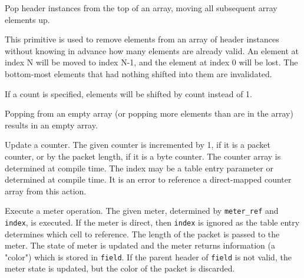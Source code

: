 \documentclass[12pt]{article}
\begin{document}

{ %
Pop header instances from the top of an array, moving all subsequent array elements up.
}
{ %
}
{ %
This primitive is used to remove elements from an array of header instances
without knowing in advance how many elements are already valid. An element at
index N will be moved to index N-1, and the element at index 0 will be lost. The
bottom-most elements that had nothing shifted into them are invalidated.


If a count is specified, elements will be shifted by count instead of 1.


Popping from an empty array (or popping more elements than are in the array)
results in an empty array.
}


{ %
Update a counter.
}
{ %
}
{ %
The given counter is incremented by 1, if it is a packet counter, or by the 
packet length, if it is a byte counter.  The counter array is determined 
at compile time.  The index may be a table entry parameter or determined at 
compile time. It is an error to reference a direct-mapped counter array from 
this action.
}


{ %
Execute a meter operation.
}
{ %
}
{ %
The given meter, determined by \texttt{meter_ref} and \texttt{index}, is executed. If the 
meter is direct, then \texttt{index} is ignored as the table entry determines which 
cell to reference. The length of the packet is passed to the meter. The state 
of meter is updated and the meter returns information (a "color") which is 
stored in \texttt{field}. If the parent header of \texttt{field} is not valid, the meter 
state is updated, but the color of the packet is discarded.
}
\end{document}
